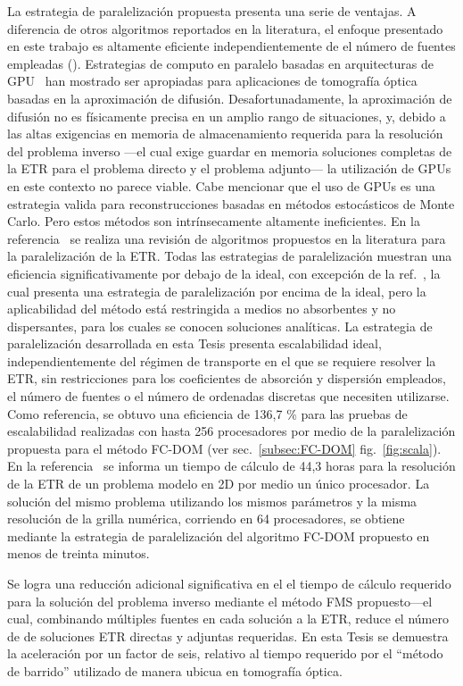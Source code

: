 La estrategia de paralelización propuesta presenta una serie de
ventajas. A diferencia de otros algoritmos reportados en la literatura, el enfoque
presentado en este trabajo es altamente eficiente independientemente de
el número de fuentes empleadas (\cf \cite{Hielscher2004}).
Estrategias de computo en paralelo basadas en arquitecturas de GPU~\cite{Doulgerakis2017} han mostrado ser apropiadas para aplicaciones de tomografía óptica basadas en la aproximación de difusión. Desafortunadamente, 
la aproximación de difusión no es físicamente precisa en un amplio rango de situaciones,
y, debido a las altas exigencias en memoria de almacenamiento requerida para 
la resolución del problema inverso ---el cual exige guardar en memoria soluciones completas 
de la ETR para el problema 
directo y el problema adjunto--- la utilización de GPUs en este contexto no parece viable. 
Cabe mencionar que el uso de GPUs es una estrategia valida para reconstrucciones 
basadas en métodos estocásticos de Monte Carlo. Pero estos métodos son intrínsecamente 
altamente ineficientes. En la 
referencia~\cite{Coelho2014} se realiza una revisión de algoritmos propuestos en la literatura 
para la paralelización de la ETR. Todas las estrategias de paralelización muestran una eficiencia significativamente por debajo de la ideal, con excepción de la ref.~\cite {Colomer2013}, la cual presenta una estrategia de paralelización 
por encima de la ideal, pero
la aplicabilidad del método está restringida a medios no absorbentes y no dispersantes, 
para los cuales se conocen soluciones analíticas. La estrategia de paralelización 
desarrollada en esta Tesis presenta escalabilidad ideal, independientemente 
del régimen de transporte en el que se requiere resolver la ETR, sin restricciones 
para los coeficientes de absorción y dispersión empleados, el número de fuentes o el número de ordenadas discretas que necesiten utilizarse. Como referencia, se obtuvo una eficiencia de 136,7 \% para las pruebas de escalabilidad realizadas con hasta 256 procesadores por
medio de la paralelización propuesta para el método FC-DOM (ver sec.~\ref{subsec:FC-DOM} fig.~\ref{fig:scala}). En la referencia~\cite [p. 153]{Fujii2014} 
se informa un tiempo de cálculo de 44,3 horas para la resolución de la ETR de un problema modelo 
en 2D por medio un único procesador. La solución del mismo problema utilizando 
los mismos parámetros y la misma resolución de la grilla numérica, corriendo en 64 procesadores, se obtiene mediante la estrategia de paralelización del algoritmo FC-DOM propuesto en menos de treinta minutos.

Se logra una reducción adicional significativa en el
el tiempo de cálculo requerido para la solución del problema inverso mediante el método FMS propuesto---el cual, combinando
múltiples fuentes en cada solución a la ETR, reduce el número de
de soluciones ETR directas y adjuntas requeridas. 
En esta Tesis se demuestra la aceleración por un factor de seis, 
relativo al tiempo requerido por el ``método de barrido'' 
utilizado de manera ubicua en tomografía óptica.
 
\pagestyle{empty}

%

